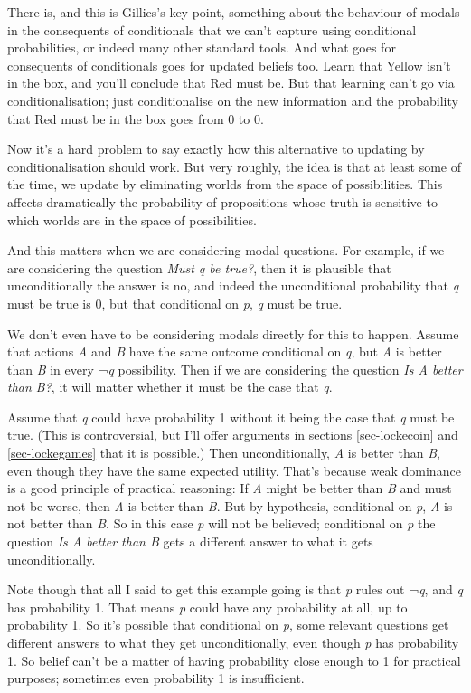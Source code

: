\documentclass[
  12pt,
  letterpaper,
]{scrbook}
\begin{document}
There is, and this is Gillies's key point, something about the behaviour
of modals in the consequents of conditionals that we can't capture using
conditional probabilities, or indeed many other standard tools. And what
goes for consequents of conditionals goes for updated beliefs too. Learn
that Yellow isn't in the box, and you'll conclude that Red must be. But
that learning can't go via conditionalisation; just conditionalise on
the new information and the probability that Red must be in the box goes
from 0 to 0.

Now it's a hard problem to say exactly how this alternative to updating
by conditionalisation should work. But very roughly, the idea is that at
least some of the time, we update by eliminating worlds from the space
of possibilities. This affects dramatically the probability of
propositions whose truth is sensitive to which worlds are in the space
of possibilities.

And this matters when we are considering modal questions. For example,
if we are considering the question \emph{Must q be true?}, then it is
plausible that unconditionally the answer is no, and indeed the
unconditional probability that \emph{q} must be true is 0, but that
conditional on \emph{p}, \emph{q} must be true.

We don't even have to be considering modals directly for this to happen.
Assume that actions \emph{A} and \emph{B} have the same outcome
conditional on \emph{q}, but \emph{A} is better than \emph{B} in every
¬\emph{q} possibility. Then if we are considering the question \emph{Is
A better than B?}, it will matter whether it must be the case that
\emph{q}.

Assume that \emph{q} could have probability 1 without it being the case
that \emph{q} must be true. (This is controversial, but I'll offer
arguments in sections \ref{sec-lockecoin} and \ref{sec-lockegames} that
it is possible.) Then unconditionally, \emph{A} is better than \emph{B},
even though they have the same expected utility. That's because weak
dominance is a good principle of practical reasoning: If \emph{A} might
be better than \emph{B} and must not be worse, then \emph{A} is better
than \emph{B}. But by hypothesis, conditional on \emph{p}, \emph{A} is
not better than \emph{B}. So in this case \emph{p} will not be believed;
conditional on \emph{p} the question \emph{Is A better than B} gets a
different answer to what it gets unconditionally.

Note though that all I said to get this example going is that \emph{p}
rules out ¬\emph{q}, and \emph{q} has probability 1. That means \emph{p}
could have any probability at all, up to probability 1. So it's possible
that conditional on \emph{p}, some relevant questions get different
answers to what they get unconditionally, even though \emph{p} has
probability 1. So belief can't be a matter of having probability close
enough to 1 for practical purposes; sometimes even probability 1 is
insufficient.
\end{document}
